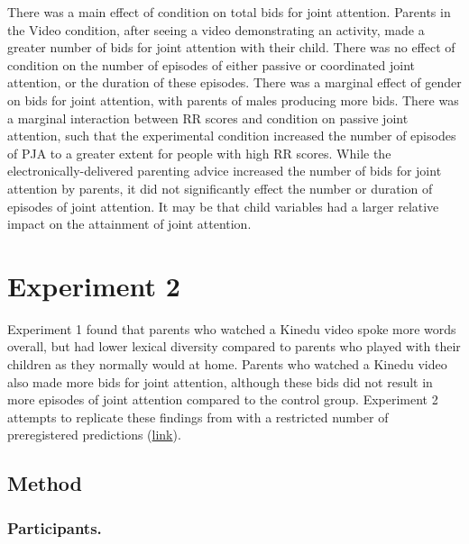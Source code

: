 \documentclass[]{article}
\begin{document}
There was a main effect of condition on total bids for joint attention.
Parents in the Video condition, after seeing a video demonstrating an
activity, made a greater number of bids for joint attention with their
child. There was no effect of condition on the number of episodes of
either passive or coordinated joint attention, or the duration of these
episodes. There was a marginal effect of gender on bids for joint
attention, with parents of males producing more bids. There was a
marginal interaction between RR scores and condition on passive joint
attention, such that the experimental condition increased the number of
episodes of PJA to a greater extent for people with high RR scores.
While the electronically-delivered parenting advice increased the number
of bids for joint attention by parents, it did not significantly effect
the number or duration of episodes of joint attention. It may be that
child variables had a larger relative impact on the attainment of joint
attention.

\hypertarget{experiment-2}{%
\section{Experiment 2}\label{experiment-2}}

Experiment 1 found that parents who watched a Kinedu video spoke more
words overall, but had lower lexical diversity compared to parents who
played with their children as they normally would at home. Parents who
watched a Kinedu video also made more bids for joint attention, although
these bids did not result in more episodes of joint attention compared
to the control group. Experiment 2 attempts to replicate these findings
from with a restricted number of preregistered predictions
(\href{https://osf.io/2bpdf/}{link}).

\hypertarget{method-1}{%
\subsection{Method}\label{method-1}}

\hypertarget{participants.-1}{%
\subsubsection{Participants.}\label{participants.-1}}
\end{document}
